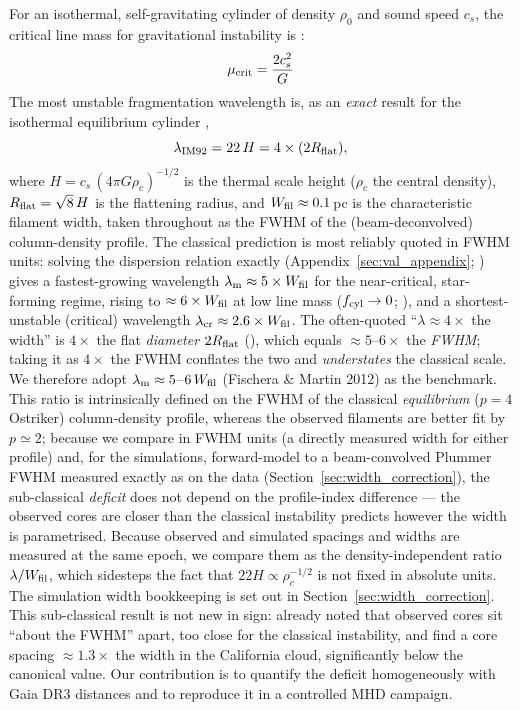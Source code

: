 \documentclass[usenatbib,twoside,twocolumn]{mnras}
\begin{document}
For an isothermal, self-gravitating cylinder of density $\rho_0$ and sound speed $c_s$, the critical line mass for gravitational instability is \citep{Ostriker1964}:
\begin{equation}
\mu_{\rm crit} = \frac{2c_s^2}{G}
\end{equation}
The most unstable fragmentation wavelength is, as an \emph{exact} result for the isothermal equilibrium cylinder \citep{Inutsuka1992},
\begin{equation}
\lambda_{\rm IM92} = 22\,H = 4\times(2R_{\rm flat}),
\label{eq:im92}
\end{equation}
where $H = c_s\,(4\pi G\rho_c)^{-1/2}$ is the thermal scale height ($\rho_c$ the central density), $R_{\rm flat}=\sqrt8\,H$ is the flattening radius, and $W_{\rm fil}\approx0.1$\,pc is the characteristic filament width, taken throughout as the FWHM of the (beam-deconvolved) column-density profile. The classical prediction is most reliably quoted in FWHM units: solving the dispersion relation exactly (Appendix~\ref{sec:val_appendix}; \citealt{Fischera2012}) gives a fastest-growing wavelength $\lambda_{\rm m}\approx5\times W_{\rm fil}$ for the near-critical, star-forming regime, rising to $\approx6\times W_{\rm fil}$ at low line mass ($f_{\rm cyl}\to0$; \citealt{Fischera2012}), and a shortest-unstable (critical) wavelength $\lambda_{\rm cr}\approx2.6\times W_{\rm fil}$. The often-quoted ``$\lambda\approx4\times$ the width'' is $4\times$ the flat \emph{diameter} $2R_{\rm flat}$ (\citealt{Inutsuka1992}), which equals $\approx5$--$6\times$ the \emph{FWHM}; taking it as $4\times$ the FWHM conflates the two and \emph{understates} the classical scale. We therefore adopt $\lambda_{\rm m}\approx5$--$6\,W_{\rm fil}$ (Fischera \& Martin 2012) as the benchmark. This ratio is intrinsically defined on the FWHM of the classical \emph{equilibrium} ($p=4$ Ostriker) column-density profile, whereas the observed filaments are better fit by $p\simeq2$; because we compare in FWHM units (a directly measured width for either profile) and, for the simulations, forward-model to a beam-convolved Plummer FWHM measured exactly as on the data (Section~\ref{sec:width_correction}), the sub-classical \emph{deficit} does not depend on the profile-index difference --- the observed cores are closer than the classical instability predicts however the width is parametrised. Because observed and simulated spacings and widths are measured at the same epoch, we compare them as the density-independent ratio $\lambda/W_{\rm fil}$, which sidesteps the fact that $22H\propto\rho_c^{-1/2}$ is not fixed in absolute units. The simulation width bookkeeping is set out in Section~\ref{sec:width_correction}. This sub-classical result is not new in sign: \citet{Fischera2012} already noted that observed cores sit ``about the FWHM'' apart, too close for the classical instability, and \citet{Zhang2023cal} find a core spacing $\approx1.3\times$ the width in the California cloud, significantly below the canonical value. Our contribution is to quantify the deficit homogeneously with Gaia DR3 distances and to reproduce it in a controlled MHD campaign.
\end{document}
